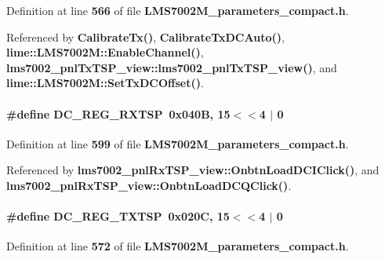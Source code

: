 Definition at line {\bf 566} of file {\bf L\+M\+S7002\+M\+\_\+parameters\+\_\+compact.\+h}.



Referenced by {\bf Calibrate\+Tx()}, {\bf Calibrate\+Tx\+D\+C\+Auto()}, {\bf lime\+::\+L\+M\+S7002\+M\+::\+Enable\+Channel()}, {\bf lms7002\+\_\+pnl\+Tx\+T\+S\+P\+\_\+view\+::lms7002\+\_\+pnl\+Tx\+T\+S\+P\+\_\+view()}, and {\bf lime\+::\+L\+M\+S7002\+M\+::\+Set\+Tx\+D\+C\+Offset()}.

\paragraph[{D\+C\+\_\+\+R\+E\+G\+\_\+\+R\+X\+T\+SP}]{\setlength{\rightskip}{0pt plus 5cm}\#define D\+C\+\_\+\+R\+E\+G\+\_\+\+R\+X\+T\+SP~0x040\+B, 15$<$$<$4 $\vert$  0}\label{LMS7002M__parameters__compact_8h_a0fc60f09d95c16295fd13aa25f038091}


Definition at line {\bf 599} of file {\bf L\+M\+S7002\+M\+\_\+parameters\+\_\+compact.\+h}.



Referenced by {\bf lms7002\+\_\+pnl\+Rx\+T\+S\+P\+\_\+view\+::\+Onbtn\+Load\+D\+C\+I\+Click()}, and {\bf lms7002\+\_\+pnl\+Rx\+T\+S\+P\+\_\+view\+::\+Onbtn\+Load\+D\+C\+Q\+Click()}.

\paragraph[{D\+C\+\_\+\+R\+E\+G\+\_\+\+T\+X\+T\+SP}]{\setlength{\rightskip}{0pt plus 5cm}\#define D\+C\+\_\+\+R\+E\+G\+\_\+\+T\+X\+T\+SP~0x020\+C, 15$<$$<$4 $\vert$  0}\label{LMS7002M__parameters__compact_8h_a8786c8dc3ffba64d6c2c2fe91b3b8cbd}


Definition at line {\bf 572} of file {\bf L\+M\+S7002\+M\+\_\+parameters\+\_\+compact.\+h}.



